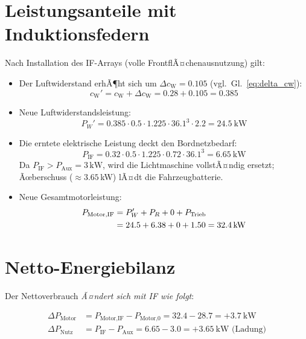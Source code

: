 ﻿\documentclass[12pt, a4paper]{report}
\theoremstyle{definition}
\theoremstyle{remark}
\newcommand{\cW}{c_{\text{W}}}
\begin{document}
\section{Leistungsanteile mit Induktionsfedern}

Nach Installation des IF-Arrays (volle FrontflÃ¤chenausnutzung) gilt:

\begin{itemize}
  \item Der Luftwiderstand erhÃ¶ht sich um $\Delta\cW = 0.105$ (vgl.\ Gl.~\eqref{eq:delta_cw}):
  \begin{equation}
    \cW' = \cW + \Delta\cW = 0.28 + 0.105 = 0.385
    \label{eq:cw_neu}
  \end{equation}
  \item Neue Luftwiderstandsleistung:
  \begin{equation}
    P_W' = 0.385 \cdot 0.5 \cdot 1.225 \cdot 36.1^3 \cdot 2.2 = \SI{24.5}{\kilo\watt}
    \label{eq:pw_neu}
  \end{equation}
  \item Die erntete elektrische Leistung deckt den Bordnetzbedarf:
  \begin{equation}
    P_{\text{IF}} = 0.32 \cdot 0.5 \cdot 1.225 \cdot 0.72 \cdot 36.1^3 = \SI{6.65}{\kilo\watt}
    \label{eq:p_if_130}
  \end{equation}
  Da $P_{\text{IF}} > P_{\text{Aux}} = 3\,\text{kW}$, wird die Lichtmaschine vollstÃ¤ndig
  ersetzt; Ãœberschuss ($\approx 3.65$\,kW) lÃ¤dt die Fahrzeugbatterie.
  \item Neue Gesamtmotorleistung:
  \begin{align}
    P_{\text{Motor,IF}} &= P_W' + P_R + 0 + P_{\text{Trieb}} \notag \\
    &= 24.5 + 6.38 + 0 + 1.50 = \SI{32.4}{\kilo\watt}
    \label{eq:p_motor_if}
  \end{align}
\end{itemize}

\section{Netto-Energiebilanz}

Der Nettoverbrauch \emph{Ã¤ndert sich mit IF wie folgt}:

\begin{align}
  \Delta P_{\text{Motor}} &= P_{\text{Motor,IF}} - P_{\text{Motor,0}} = 32.4 - 28.7 = +\SI{3.7}{\kilo\watt}
  \label{eq:delta_p_motor} \\
  \Delta P_{\text{Nutz}} &= P_{\text{IF}} - P_{\text{Aux}} = 6.65 - 3.0 = +\SI{3.65}{\kilo\watt}\text{ (Ladung)}
  \label{eq:delta_p_nutz}
\end{align}
\end{document}
